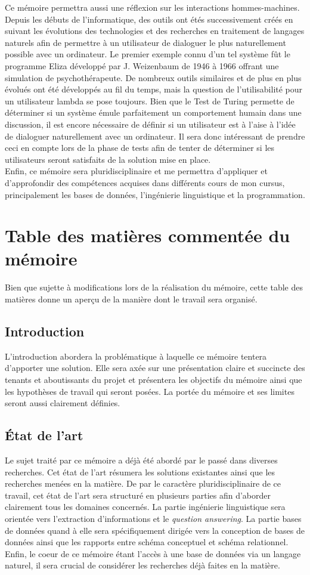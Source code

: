 \documentclass[a4paper,12pt]{article}
\begin{document}
Ce mémoire permettra aussi une réflexion sur les interactions hommes-machines.
Depuis les débuts de l'informatique, des outils ont étés successivement créés en suivant les évolutions des technologies et des recherches en traitement de langages naturels afin de permettre à un utilisateur de dialoguer le plus naturellement possible avec un ordinateur.
Le premier exemple connu d'un tel système fût le programme Eliza développé par J. Weizenbaum de 1946 à 1966 offrant une simulation de psychothérapeute.
De nombreux outils similaires et de plus en plus évolués ont été développés au fil du temps, mais la question de l'utilisabilité pour un utilisateur lambda se pose toujours.
Bien que le Test de Turing permette de déterminer si un système émule parfaitement un comportement humain dans une discussion, il est encore nécessaire de définir si un utilisateur est à l'aise à l'idée de dialoguer naturellement avec un ordinateur.
Il sera donc intéressant de prendre ceci en compte lors de la phase de tests afin de tenter de déterminer si les utilisateurs seront satisfaits de la solution mise en place. \\

Enfin, ce mémoire sera pluridisciplinaire et me permettra d'appliquer et d'approfondir des compétences acquises dans différents cours de mon cursus, principalement les bases de données, l'ingénierie linguistique et la programmation. 
\newpage
\section{Table des matières commentée du mémoire}
Bien que sujette à modifications lors de la réalisation du mémoire, cette table des matières donne un aperçu de la manière dont le travail sera organisé.
\subsection{Introduction}
L'introduction abordera la problématique à laquelle ce mémoire tentera d'apporter une solution.
Elle sera axée sur une présentation claire et succincte des tenants et aboutissants du projet et présentera les objectifs du mémoire ainsi que les hypothèses de travail qui seront posées.
La portée du mémoire et ses limites seront aussi clairement définies.
\subsection{État de l'art}
Le sujet traité par ce mémoire a déjà été abordé par le passé dans diverses recherches.
Cet état de l'art résumera les solutions existantes ainsi que les recherches menées en la matière.
De par le caractère pluridisciplinaire de ce travail, cet état de l'art sera structuré en plusieurs parties afin d'aborder clairement tous les domaines concernés.
La partie ingénierie linguistique sera orientée vers l'extraction d'informations et le \textit{question answering}.
La partie bases de données quand à elle sera spécifiquement dirigée vers la conception de bases de données ainsi que les rapports entre schéma conceptuel et schéma relationnel.
Enfin, le coeur de ce mémoire étant l'accès à une base de données via un langage naturel, il sera crucial de considérer les recherches déjà faites en la matière.
\end{document}
